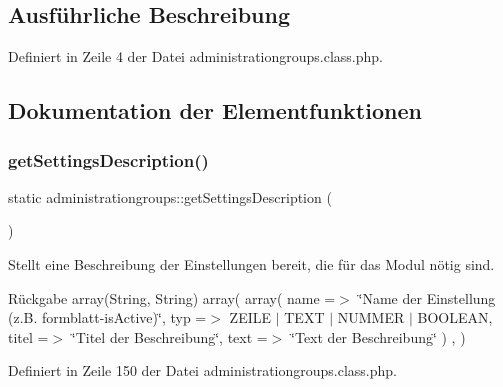 \subsection{Ausführliche Beschreibung}


Definiert in Zeile 4 der Datei administrationgroups.\+class.\+php.



\subsection{Dokumentation der Elementfunktionen}
\mbox{\label{classadministrationgroups_a52fddd1dca1f58bd62a19e2566e64d28}} 
\subsubsection{\texorpdfstring{get\+Settings\+Description()}{getSettingsDescription()}}
{\footnotesize\ttfamily static administrationgroups\+::get\+Settings\+Description (\begin{DoxyParamCaption}{ }\end{DoxyParamCaption})\hspace{0.3cm}{\ttfamily [static]}}

Stellt eine Beschreibung der Einstellungen bereit, die für das Modul nötig sind. \begin{DoxyReturn}{Rückgabe}
array(\+String, String) array( array( \textquotesingle{}name\textquotesingle{} =$>$ \char`\"{}\+Name der Einstellung (z.\+B. formblatt-\/is\+Active)\char`\"{}, \textquotesingle{}typ\textquotesingle{} =$>$ Z\+E\+I\+LE $\vert$ T\+E\+XT $\vert$ N\+U\+M\+M\+ER $\vert$ B\+O\+O\+L\+E\+AN, \textquotesingle{}titel\textquotesingle{} =$>$ \char`\"{}\+Titel der Beschreibung\char`\"{}, \textquotesingle{}text\textquotesingle{} =$>$ \char`\"{}\+Text der Beschreibung\char`\"{} ) , ) 
\end{DoxyReturn}


Definiert in Zeile 150 der Datei administrationgroups.\+class.\+php.

\mbox{\label{classadministrationgroups_aa7f2d7da9d6838ed5fc66b01e7a7ff5e}} 
